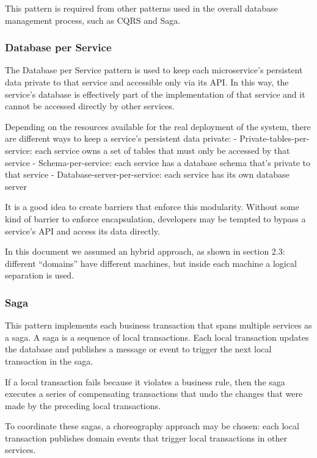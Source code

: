 This pattern is required from other patterns used in the overall database management process, such as CQRS and Saga.

\subsubsection{Database per Service}
The Database per Service pattern is used to keep each microservice’s persistent data private to that service and accessible only via its API. In this way, the service’s database is effectively part of the implementation of that service and it cannot be accessed directly by other services.

Depending on the resources available for the real deployment of the system, there are different ways to keep a service’s persistent data private:
\newline
- Private-tables-per-service: each service owns a set of tables that must only be accessed by that service
\newline
- Schema-per-service: each service has a database schema that’s private to that service
\newline
- Database-server-per-service: each service has its own database server

It is a good idea to create barriers that enforce this modularity. Without some kind of barrier to enforce encapsulation, developers may be tempted to bypass a service’s API and access its data directly.

In this document we assumed an hybrid approach, as shown in section 2.3: different “domains” have different machines, but inside each machine a logical separation is used.

\subsubsection{Saga}
This pattern implements each business transaction that spans multiple services as a saga. A saga is a sequence of local transactions. Each local transaction updates the database and publishes a message or event to trigger the next local transaction in the saga. 

If a local transaction fails because it violates a business rule, then the saga executes a series of compensating transactions that undo the changes that were made by the preceding local transactions.

To coordinate these sagas, a choreography approach may be chosen: each local transaction publishes domain events that trigger local transactions in other services.

